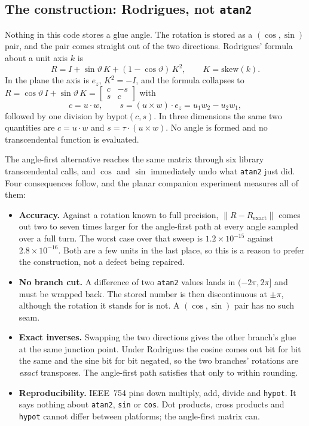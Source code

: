 \subsection{The construction: Rodrigues, not \texttt{atan2}}

Nothing in this code stores a glue angle. The rotation is stored as a
$(\cos,\sin)$ pair, and the pair comes straight out of the two
directions. Rodrigues' formula about a unit axis $k$ is
\begin{equation}
  R = I + \sin\vartheta\,K + (1-\cos\vartheta)\,K^2 ,
  \qquad K = \mathrm{skew}(k) .
\end{equation}
In the plane the axis is $e_z$, $K^2=-I$, and the formula collapses to
$R = \cos\vartheta\,I + \sin\vartheta\,K = \begin{bmatrix} c & -s\\ s &
c\end{bmatrix}$ with
\begin{equation}
  c = u\cdot w , \qquad
  s = (u\times w)\cdot e_z = u_1w_2 - u_2w_1 ,
\end{equation}
followed by one division by $\mathrm{hypot}(c,s)$. In three dimensions
the same two quantities are $c = u\cdot w$ and
$s = \tau\cdot(u\times w)$. No angle is formed and no transcendental
function is evaluated.

The angle-first alternative reaches the same matrix through six library
transcendental calls, and $\cos$ and $\sin$ immediately undo what
\texttt{atan2} just did. Four consequences follow, and the planar
companion experiment measures all of them:
\begin{itemize}
  \item \textbf{Accuracy.} Against a rotation known to full precision,
        $\|R-R_{\mathrm{exact}}\|$ comes out two to seven times larger
        for the angle-first path at every angle sampled over a full turn.
        The worst case over that sweep is $1.2\times10^{-15}$ against
        $2.8\times10^{-16}$. Both are a few units in the last place, so
        this is a reason to prefer the construction, not a defect being
        repaired.
  \item \textbf{No branch cut.} A difference of two \texttt{atan2} values
        lands in $(-2\pi,2\pi]$ and must be wrapped back. The stored
        number is then discontinuous at $\pm\pi$, although the rotation
        it stands for is not. A $(\cos,\sin)$ pair has no such seam.
  \item \textbf{Exact inverses.} Swapping the two directions gives the
        other branch's glue at the same junction point. Under Rodrigues
        the cosine comes out bit for bit the same and the sine bit for
        bit negated, so the two branches' rotations are \emph{exact}
        transposes. The angle-first path satisfies that only to within
        rounding.
  \item \textbf{Reproducibility.} IEEE~754 pins down multiply, add,
        divide and \texttt{hypot}. It says nothing about \texttt{atan2},
        \texttt{sin} or \texttt{cos}. Dot products, cross products and
        \texttt{hypot} cannot differ between platforms; the angle-first
        matrix can.
\end{itemize}

